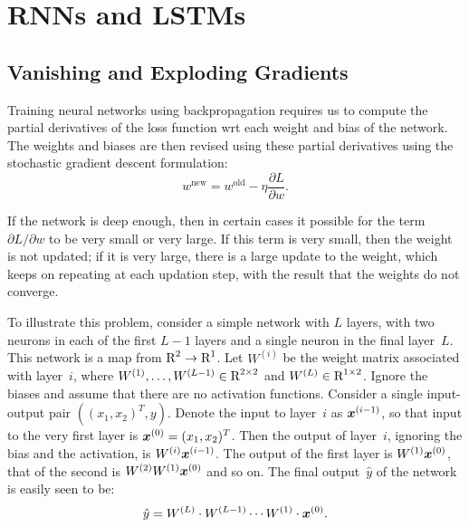 \chapter{RNNs and LSTMs}

\section{Vanishing and Exploding Gradients}
Training neural networks using backpropagation requires us to compute the 
partial derivatives of the loss function wrt each weight and bias of the network.
The weights and biases are then revised using these partial derivatives using the 
stochastic gradient descent formulation:
\[
    w^{\text{new}} = w^{\text{old}} - \eta \frac{\partial L}{\partial w}.
\]

If the network is deep enough, then in certain cases it possible for 
the term $\partial L / \partial w$ to be very small or very large. If this term 
is very small, then the weight is not updated; if it is very large, there is a 
large update to the weight, which keeps on repeating at each updation step, with 
the result that the weights do not converge. 

To illustrate this problem, consider a simple network with $L$ layers, with 
two neurons in each of the first $L - 1$ layers and a single neuron in the 
final layer~$L$. This network is a map from $\text{R}^2 \to \text{R}^1$. Let 
$W^{(i)}$ be the weight matrix associated with layer~$i$, where 
$W^{(1)}, \ldots, W^{(L - 1)} \in \text{R}^{2 \times 2}$ and $W^{(L)} \in \text{R}^{1 \times 2}$. 
Ignore the biases and assume that there are no activation functions. Consider 
a single input-output pair $((x_1, x_2)^{T}, y)$. 
Denote the input to layer~$i$ as $\boldsymbol{x}^{(i - 1)}$, so that input to the 
very first layer is $\boldsymbol{x}^{(0)} = (x_1, x_2)^{T}$. Then the output of 
layer~$i$, ignoring the bias and the activation, is $W^{(i)} \boldsymbol{x}^{(i - 1)}$. 
The output of the first layer is $W^{(1)} \boldsymbol{x}^{(0)}$, that of the second 
is $W^{(2)} W^{(1)} \boldsymbol{x}^{(0)}$ and so on. The final output~$\hat{y}$ of the 
network is easily seen to be:
\[
    \hat{y} = W^{(L)} \cdot W^{(L - 1)} \cdots W^{(1)} \cdot \boldsymbol{x}^{(0)}.
\]

